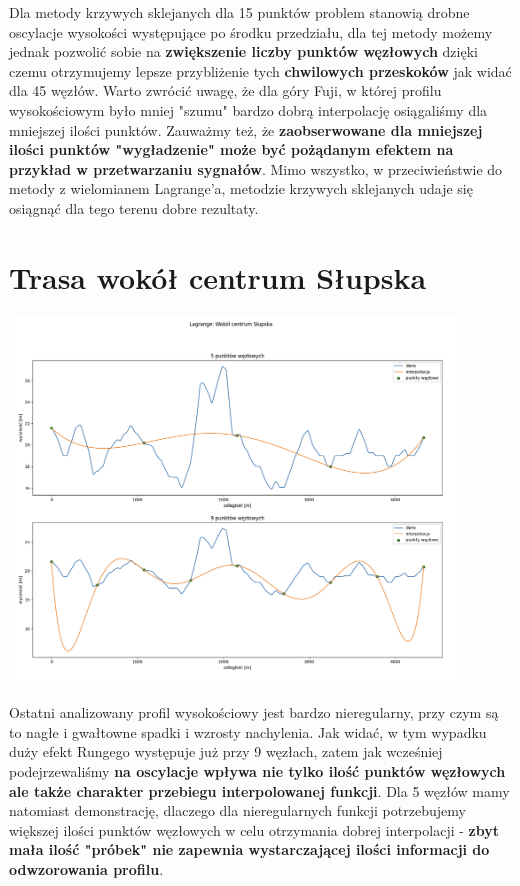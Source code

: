 \documentclass{article}
\begin{document}
Dla metody krzywych sklejanych dla 15 punktów problem stanowią drobne oscylacje wysokości występujące po środku przedziału, dla tej metody możemy jednak
pozwolić sobie na \textbf{zwiększenie liczby punktów węzłowych} dzięki czemu otrzymujemy lepsze przybliżenie tych \textbf{chwilowych przeskoków} jak widać dla 45 węzłów. Warto zwrócić uwagę, że dla góry Fuji, w której profilu wysokościowym było mniej "szumu" bardzo dobrą interpolację osiągaliśmy dla mniejszej ilości punktów.
Zauważmy też, że \textbf{zaobserwowane dla mniejszej ilości punktów "wygładzenie" może być pożądanym efektem na przykład w przetwarzaniu sygnałów}.
Mimo wszystko, w przeciwieństwie do metody z wielomianem Lagrange'a, metodzie krzywych sklejanych udaje się osiągnąć dla tego terenu dobre rezultaty.
\section{Trasa wokół centrum Słupska}
 \begin{center}
	\includegraphics[width=12cm]{lagrange_slupsk_uniform}
\end{center}
Ostatni analizowany profil wysokościowy jest bardzo nieregularny, przy czym są to nagłe i gwałtowne spadki i wzrosty nachylenia.  Jak widać, w tym wypadku
duży efekt Rungego występuje już przy 9 węzłach, zatem jak wcześniej podejrzewaliśmy \textbf{na oscylacje wpływa nie tylko ilość punktów węzłowych ale także charakter
przebiegu interpolowanej funkcji}. Dla 5 węzłów mamy natomiast demonstrację, dlaczego dla nieregularnych funkcji potrzebujemy większej ilości punktów węzłowych w celu
otrzymania dobrej interpolacji - \textbf{zbyt mała ilość "próbek" nie zapewnia wystarczającej ilości informacji do odwzorowania profilu}. \\\\
\end{document}
